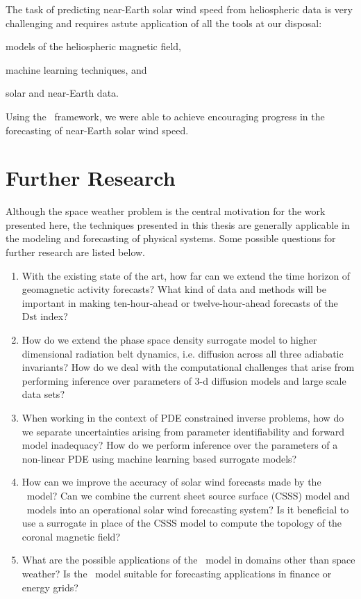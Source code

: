 The task of predicting near-Earth solar wind speed from heliospheric data is 
very challenging and requires astute application of all the tools at our 
disposal: 
\begin{enumerate*} 
    \item models of the heliospheric magnetic field,
    \item machine learning techniques, and 
    \item solar and near-Earth data. 
\end{enumerate*}
Using the \XX \ framework, we were able to achieve encouraging progress in the 
forecasting of near-Earth solar wind speed.
 

\section{Further Research}

Although the space weather problem is the central motivation for the work 
presented here, the techniques presented in this thesis are generally 
applicable in the modeling and forecasting of physical systems. Some possible 
questions for further research are listed below.
%
\begin{enumerate}
    \item With the existing state of the art, how far can we extend the time 
          horizon of geomagnetic activity forecasts? What kind of data and 
          methods will be important in making ten-hour-ahead or 
          twelve-hour-ahead forecasts of the $\mathrm{Dst}$ index?
    \item How do we extend the phase space density surrogate model to higher 
          dimensional radiation belt dynamics, i.e. diffusion across all three 
          adiabatic invariants? How do we deal with the computational 
          challenges that arise from performing inference over parameters of 
          $3$-d diffusion models and large scale data sets? 
    \item When working in the context of PDE constrained inverse problems, how 
          do we separate uncertainties arising from parameter identifiability 
          and forward model inadequacy? How do we perform inference over the 
          parameters of a non-linear PDE using machine learning based 
          surrogate models?
    \item How can we improve the accuracy of solar wind forecasts made by the 
          \XX \ model? Can we combine the current sheet source surface (CSSS) 
          model and \XX \ models into an operational solar wind forecasting 
          system? Is it beneficial to use a surrogate in place of the CSSS 
          model to compute the topology of the coronal magnetic field? 
    \item What are the possible applications of the \XX \ model in domains 
          other than space weather? Is the \XX \ model suitable for forecasting 
          applications in finance or energy grids? 
\end{enumerate}
%
